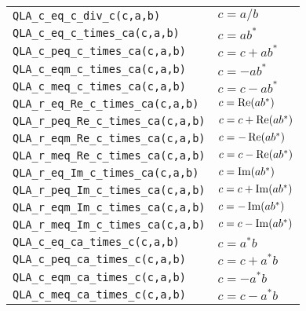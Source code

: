 \documentclass{article}
\renewcommand{\Re}{\mathop{\rm Re}}
\renewcommand{\Im}{\mathop{\rm Im}}
\begin{document}
\begin{center}
\begin{tabular}{|l|l|}
\verb|QLA_c_eq_c_div_c(c,a,b)       | & $ c = a / b                       $ \\
\verb|QLA_c_eq_c_times_ca(c,a,b)    | & $ c = ab^*                        $ \\
\verb|QLA_c_peq_c_times_ca(c,a,b)   | & $ c = c +  ab^*                   $ \\
\verb|QLA_c_eqm_c_times_ca(c,a,b)   | & $ c = -ab^*                       $ \\
\verb|QLA_c_meq_c_times_ca(c,a,b)   | & $ c = c -  ab^*                   $ \\
\verb|QLA_r_eq_Re_c_times_ca(c,a,b) | & $ c = \Re(ab^*)                   $ \\
\verb|QLA_r_peq_Re_c_times_ca(c,a,b)| & $ c = c +  \Re(ab^*)              $ \\
\verb|QLA_r_eqm_Re_c_times_ca(c,a,b)| & $ c = -\Re(ab^*)                  $ \\
\verb|QLA_r_meq_Re_c_times_ca(c,a,b)| & $ c = c - \Re(ab^*)               $ \\
\verb|QLA_r_eq_Im_c_times_ca(c,a,b) | & $ c = \Im(ab^*)                   $ \\
\verb|QLA_r_peq_Im_c_times_ca(c,a,b)| & $ c = c +  \Im(ab^*)              $ \\
\verb|QLA_r_eqm_Im_c_times_ca(c,a,b)| & $ c = -\Im(ab^*)                  $ \\
\verb|QLA_r_meq_Im_c_times_ca(c,a,b)| & $ c = c - \Im(ab^*)               $ \\
\verb|QLA_c_eq_ca_times_c(c,a,b)    | & $ c = a^*b                        $ \\
\verb|QLA_c_peq_ca_times_c(c,a,b)   | & $ c = c +  a^*b                   $ \\
\verb|QLA_c_eqm_ca_times_c(c,a,b)   | & $ c = -a^*b                       $ \\
\verb|QLA_c_meq_ca_times_c(c,a,b)   | & $ c = c -  a^*b                   $ \\
\hline
\end{tabular}
\end{center}
\end{document}
